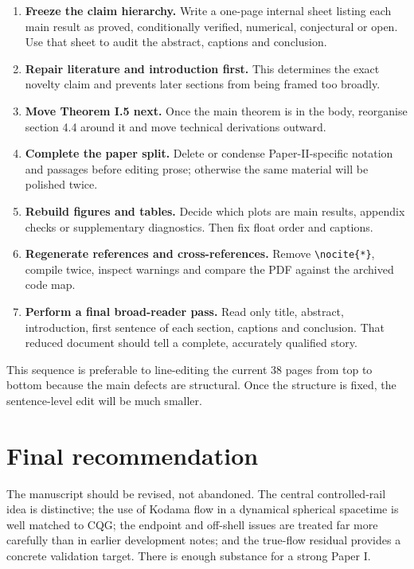 \documentclass[11pt,a4paper]{article}
\begin{document}
\begin{enumerate}
  \item \textbf{Freeze the claim hierarchy.}  Write a one-page internal sheet listing each main
  result as proved, conditionally verified, numerical, conjectural or open.  Use that sheet to
  audit the abstract, captions and conclusion.
  \item \textbf{Repair literature and introduction first.}  This determines the exact novelty
  claim and prevents later sections from being framed too broadly.
  \item \textbf{Move Theorem I.5 next.}  Once the main theorem is in the body, reorganise section
  4.4 around it and move technical derivations outward.
  \item \textbf{Complete the paper split.}  Delete or condense Paper-II-specific notation and
  passages before editing prose; otherwise the same material will be polished twice.
  \item \textbf{Rebuild figures and tables.}  Decide which plots are main results, appendix checks
  or supplementary diagnostics.  Then fix float order and captions.
  \item \textbf{Regenerate references and cross-references.}  Remove \verb|\nocite{*}|, compile
  twice, inspect warnings and compare the PDF against the archived code map.
  \item \textbf{Perform a final broad-reader pass.}  Read only title, abstract, introduction,
  first sentence of each section, captions and conclusion.  That reduced document should tell a
  complete, accurately qualified story.
\end{enumerate}

This sequence is preferable to line-editing the current 38 pages from top to bottom because the
main defects are structural.  Once the structure is fixed, the sentence-level edit will be much
smaller.

\section{Final recommendation}

The manuscript should be revised, not abandoned.  The central controlled-rail idea is distinctive;
the use of Kodama flow in a dynamical spherical spacetime is well matched to CQG; the endpoint and
off-shell issues are treated far more carefully than in earlier development notes; and the
true-flow residual provides a concrete validation target.  There is enough substance for a strong
Paper I.
\end{document}
